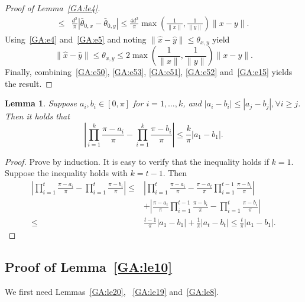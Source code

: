 \documentclass[11pt]{article}
\newtheorem{lemma}[theorem]{Lemma}
\begin{document}
\begin{proof}[Proof of Lemma~\ref{GA:le4}]
\begin{align}
\leq& \frac{d^2}{\pi} |\bar{\theta}_{0, x} - \bar{\theta}_{0, y}| \leq \frac{4 d^2}{\pi} \max\left(\frac{1}{\|x\|}, \frac{1}{\|y\|}\right) \|x - y\|. \label{GA:e52}
\end{align}
Using~\eqref{GA:e4} and~\eqref{GA:e5} and noting $\|\hat{x} - \hat{y}\| \leq \theta_{x, y}$ yield
\begin{equation} \label{GA:e15}
\|\hat{x} - \hat{y}\| \leq \theta_{x, y} \leq 2 \max\left( \frac{1}{\|x\|}, \frac{1}{\|y\|} \right) \|x - y\|.
\end{equation}
Finally, combining~\eqref{GA:e50}, \eqref{GA:e53}, \eqref{GA:e51}, \eqref{GA:e52} and~\eqref{GA:e15} yields the result.
\end{proof}

\begin{lemma} \label{GA:le17}
Suppose $a_i, b_i \in [0, \pi]$ for $i = 1, \ldots, k$, and $|a_i - b_i| \leq |a_j - b_j|, \forall i \geq j$. Then it holds that
\begin{equation*}
\left|\prod_{i = 1}^k \frac{\pi - a_i}{\pi} - \prod_{i = 1}^k \frac{\pi - b_i}{\pi}\right| \leq \frac{k}{\pi} |a_1 - b_1|.
\end{equation*}
\end{lemma}
\begin{proof}
Prove by induction. It is easy to verify that the inequality holds if $k = 1$.
Suppose the inequality holds with $k = t - 1$. Then
\begin{align*}
\left|\prod_{i = 1}^{t} \frac{\pi - a_i}{\pi} - \prod_{i = 1}^t \frac{\pi - b_i}{\pi}\right| \leq& \left|\prod_{i = 1}^{t} \frac{\pi - a_i}{\pi} - \frac{\pi - a_t}{\pi} \prod_{i = 1}^{t-1} \frac{\pi - b_i}{\pi}\right| \\
&+ \left|\frac{\pi - a_t}{\pi} \prod_{i = 1}^{t-1} \frac{\pi - b_i}{\pi} - \prod_{i = 1}^t \frac{\pi - b_i}{\pi}\right| \\
\leq& \frac{t-1}{\pi} |a_1 - b_1| + \frac{1}{\pi} |a_t - b_t| \leq \frac{t}{\pi} |a_1 - b_1|.
\end{align*}
\end{proof}

\subsection{Proof of Lemma~\ref{GA:le10}}

We first need Lemmas~\ref{GA:le20}, ~\ref{GA:le19} and~\ref{GA:le8}.

\end{document}
